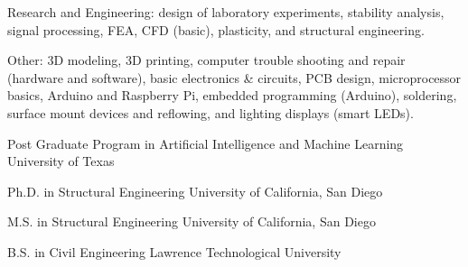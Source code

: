 \documentclass{leresume}
\begin{document}
\begin{bulletedlist}
		\item Research and Engineering: design of laboratory experiments,
                        stability analysis,
                        signal processing,
                        FEA,
                        CFD (basic),
                        plasticity,
                        and structural engineering.
                        
		\item Other: 3D modeling,
                        3D printing,
                        computer trouble shooting and repair (hardware and software),
                        basic electronics \& circuits,
                        PCB design,
                        microprocessor basics,
                        Arduino and Raspberry Pi,
                        embedded programming (Arduino),
                        soldering,
                        surface mount devices and reflowing,
                        and lighting displays (smart LEDs).
                        
	\end{bulletedlist}
	

	
                {Post Graduate Program in Artificial Intelligence and Machine Learning}
                {University of Texas}
		
                {Ph.D. in Structural Engineering}
                {University of California, San Diego}
		
                {M.S. in Structural Engineering}
                {University of California, San Diego}
		
                {B.S. in Civil Engineering}
                {Lawrence Technological University}
		

    
\end{document}
